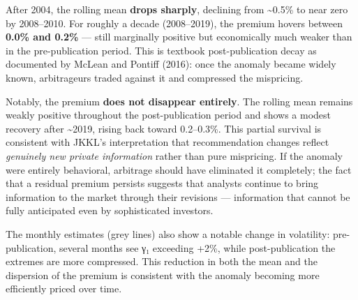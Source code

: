 \documentclass[
  letterpaper,
  DIV=11,
  numbers=noendperiod]{scrartcl}
\begin{document}
After 2004, the rolling mean \textbf{drops sharply}, declining from
\textasciitilde0.5\% to near zero by 2008--2010. For roughly a decade
(2008--2019), the premium hovers between \textbf{0.0\% and 0.2\%} ---
still marginally positive but economically much weaker than in the
pre-publication period. This is textbook post-publication decay as
documented by McLean and Pontiff (2016): once the anomaly became widely
known, arbitrageurs traded against it and compressed the mispricing.

Notably, the premium \textbf{does not disappear entirely}. The rolling
mean remains weakly positive throughout the post-publication period and
shows a modest recovery after \textasciitilde2019, rising back toward
0.2--0.3\%. This partial survival is consistent with JKKL's
interpretation that recommendation changes reflect \emph{genuinely new
private information} rather than pure mispricing. If the anomaly were
entirely behavioral, arbitrage should have eliminated it completely; the
fact that a residual premium persists suggests that analysts continue to
bring information to the market through their revisions --- information
that cannot be fully anticipated even by sophisticated investors.

The monthly estimates (grey lines) also show a notable change in
volatility: pre-publication, several months see γ₁ exceeding +2\%, while
post-publication the extremes are more compressed. This reduction in
both the mean and the dispersion of the premium is consistent with the
anomaly becoming more efficiently priced over time.
\end{document}
